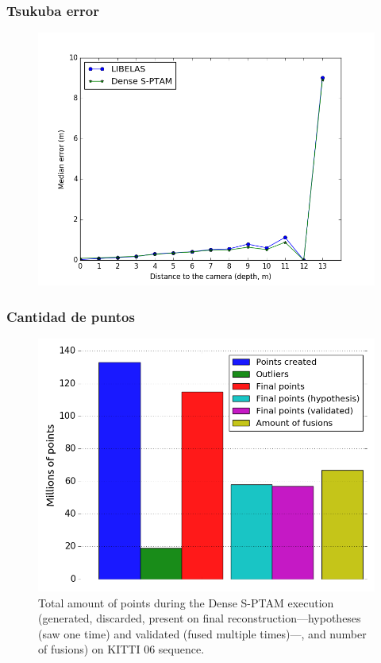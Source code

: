\documentclass[compress]{beamer}
\begin{document}
\begin{frame}
	\frametitle{Tsukuba error}
	\begin{figure}[!htb]
		\centering
		\includegraphics[width=\columnwidth]{images/medians_comparison_tsukuba}
		\label{fig:median_comparison_tsukuba}
	\end{figure}
\end{frame}

\begin{frame}
	\frametitle{Cantidad de puntos}
\begin{figure}[!htb]
	\centering
	\includegraphics[width=\columnwidth]{images/points_kitti06}
	\caption{Total amount of points during the Dense S-PTAM execution (generated, discarded, present on final reconstruction---hypotheses (saw one time) and validated (fused multiple times)---, and number of fusions) on KITTI 06 sequence.}
	\label{fig:points_kitti}
\end{figure}
\end{frame}
\end{document}
